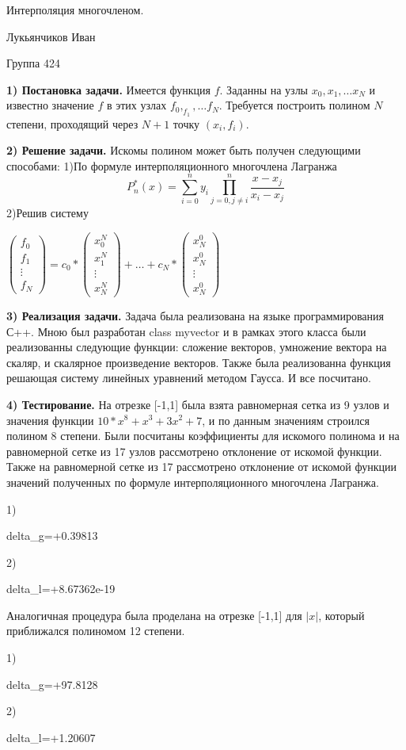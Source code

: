 \documentclass[12pt,a4paper]{scrartcl}
\begin{document}
\begin{titlepage}
\begin{center}
\large

Интерполяция многочленом.

\end{center}
\vfill
\begin{flushright}
Лукьянчиков Иван

Группа 424
\end{flushright}
\end{titlepage}
\textbf{1) Постановка задачи.}
Имеется функция $f$. Заданны на узлы $x_0,x_1, \dots x_N$ и известно значение $f$ в этих узлах $f_0,_f_1, \dots f_N$. Требуется построить полином $N$ степени, проходящий через $N+1$ точку $(x_i,f_i)$.

\textbf{2) Решение задачи.}
Искомы полином может быть получен следующими способами:
1)По формуле интерполяционного многочлена Лагранжа
$$P_n^*(x)=\sum_{i=0}^n y_i\prod_{j=0,j \neq i}^n \dfrac{x-x_j}{x_i-x_j}$$
2)Решив систему

\begin{center}

$\begin{pmatrix}
f_{0} \\
f_{1}\\
\vdots \\
f_{N}
\end{pmatrix} = c_0*\begin{pmatrix}
x_{0}^N \\
x_{1}^N\\
\vdots \\
x_{N}^N
\end{pmatrix} + \dots + c_N*\begin{pmatrix}
x_{N}^0 \\
x_{N}^0\\
\vdots \\
x_{N}^0
\end{pmatrix}$
\end{center}

\textbf{3) Реализация задачи.}
Задача была реализована на языке программирования С++. Мною был разработан class myvector и в рамках этого класса были реализованны следующие функции: сложение векторов, умножение вектора на скаляр, и скалярное произведение векторов. Также была реализованна функция решающая систему линейных уравнений методом Гаусса. И все посчитано.

\textbf{4) Тестирование.}
На отрезке [-1,1] была взята равномерная сетка из 9 узлов и значения функции $10*x^8+x^3+3x^2+7$, и по данным значениям строился полином 8 степени. Были посчитаны коэффициенты для искомого полинома и на равномерной сетке из 17 узлов рассмотрено отклонение от искомой функции. Также на равномерной сетке из 17 рассмотрено отклонение от искомой функции значений полученных по формуле интерполяционного многочлена Лагранжа.

1)

delta_g=+0.39813

2)

delta_l=+8.67362e-19

Аналогичная процедура была проделана на отрезке [-1,1] для $|x|$, который приближался полиномом 12 степени.

1)

delta_g=+97.8128

2)

delta_l=+1.20607
\end{document}
